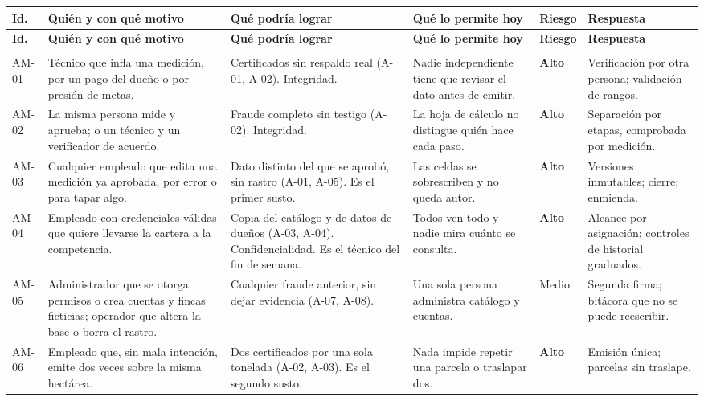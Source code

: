 \documentclass[11pt,letterpaper]{article}
\newcommand{\cab}[1]{\textbf{\rmfamily #1}}
\begin{document}
{\small
\renewcommand{\arraystretch}{1.14}
\setlength{\tabcolsep}{4pt}
\begin{longtable}{@{}L{1.25cm} L{3.3cm} L{3.8cm} L{3.4cm} L{1.0cm} L{2.6cm}@{}}
\toprule
\cab{Id.} & \cab{Quién y con qué motivo} & \cab{Qué podría lograr} & \cab{Qué lo permite hoy} & \cab{Riesgo} & \cab{Respuesta} \\
\midrule
\endfirsthead
\toprule
\cab{Id.} & \cab{Quién y con qué motivo} & \cab{Qué podría lograr} & \cab{Qué lo permite hoy} & \cab{Riesgo} & \cab{Respuesta} \\
\midrule
\endhead
\bottomrule
\endfoot
\multicolumn{6}{@{}l}{\cab{Amenazas internas}} \\
\addlinespace[2pt]
AM-01 & Técnico que infla una medición, por un pago del dueño o por presión de metas. & Certificados sin respaldo real (A-01, A-02). Integridad. & Nadie independiente tiene que revisar el dato antes de emitir. & \textbf{Alto} & Verificación por otra persona; validación de rangos. \\
AM-02 & La misma persona mide y aprueba; o un técnico y un verificador de acuerdo. & Fraude completo sin testigo (A-02). Integridad. & La hoja de cálculo no distingue quién hace cada paso. & \textbf{Alto} & Separación por etapas, comprobada por medición. \\
AM-03 & Cualquier empleado que edita una medición ya aprobada, por error o para tapar algo. & Dato distinto del que se aprobó, sin rastro (A-01, A-05). Es el primer susto. & Las celdas se sobrescriben y no queda autor. & \textbf{Alto} & Versiones inmutables; cierre; enmienda. \\
AM-04 & Empleado con credenciales válidas que quiere llevarse la cartera a la competencia. & Copia del catálogo y de datos de dueños (A-03, A-04). Confidencialidad. Es el técnico del fin de semana. & Todos ven todo y nadie mira cuánto se consulta. & \textbf{Alto} & Alcance por asignación; controles de historial graduados. \\
AM-05 & Administrador que se otorga permisos o crea cuentas y fincas ficticias; operador que altera la base o borra el rastro. & Cualquier fraude anterior, sin dejar evidencia (A-07, A-08). & Una sola persona administra catálogo y cuentas. & Medio & Segunda firma; bitácora que no se puede reescribir. \\
AM-06 & Empleado que, sin mala intención, emite dos veces sobre la misma hectárea. & Dos certificados por una sola tonelada (A-02, A-03). Es el segundo susto. & Nada impide repetir una parcela o traslapar dos. & \textbf{Alto} & Emisión única; parcelas sin traslape. \\

\end{longtable}}
\end{document}
